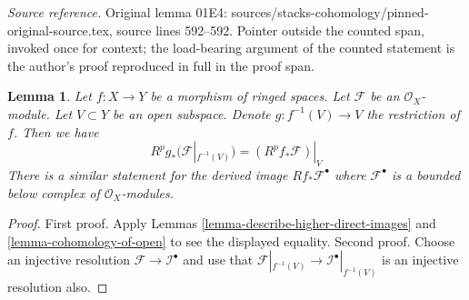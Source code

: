 \documentclass[10pt,a4paper]{amsart}
\theoremstyle{plain}
\newtheorem{lemma}[subsection]{Lemma}
\theoremstyle{definition}
\theoremstyle{remark}
\numberwithin{equation}{subsection}
\begin{document}
\noindent\textit{Source reference.} Original lemma 01E4: sources/stacks-cohomology/pinned-original-source.tex, source lines 592--592. Pointer outside the counted span, invoked once for context; the load-bearing argument of the counted statement is the author's proof reproduced in full in the proof span.\par\medskip
\begin{lemma}
\label{lemma-localize-higher-direct-images}
Let $f : X \to Y$ be a morphism of ringed spaces.
Let $\mathcal{F}$ be an $\mathcal{O}_X$-module.
Let $V \subset Y$ be an open subspace.
Denote $g : f^{-1}(V) \to V$ the restriction of $f$.
Then we have
$$
R^pg_*(\mathcal{F}|_{f^{-1}(V)}) = (R^pf_*\mathcal{F})|_V
$$
There is a similar statement for the
derived image $Rf_*\mathcal{F}^\bullet$ where $\mathcal{F}^\bullet$
is a bounded below complex of $\mathcal{O}_X$-modules.
\end{lemma}

\begin{proof}
First proof. Apply Lemmas \ref{lemma-describe-higher-direct-images}
and \ref{lemma-cohomology-of-open} to see the displayed equality.
Second proof. Choose an injective resolution
$\mathcal{F} \to \mathcal{I}^\bullet$
and use that $\mathcal{F}|_{f^{-1}(V)} \to \mathcal{I}^\bullet|_{f^{-1}(V)}$
is an injective resolution also.
\end{proof}
\end{document}
